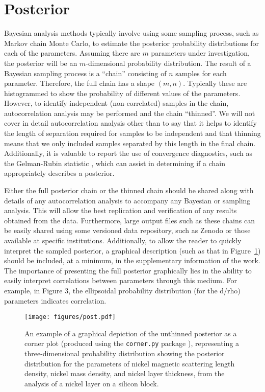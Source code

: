 \documentclass[reprint,superscriptaddress,aps,amsmath,linenumbers]{revtex4-2}
\begin{document}
\section{Posterior}
\label{sec:posterior}

Bayesian analysis methods typically involve using some sampling process, such as Markov chain Monte Carlo, to estimate the posterior probability distributions for each of the parameters. 
Assuming there are $m$ parameters under investigation, the posterior will be an $m$-dimensional probability distribution. 
The result of a Bayesian sampling process is a ``chain'' consisting of $n$ samples for each parameter. 
Therefore, the full chain has a shape $(m, n)$. 
Typically these are histogrammed to show the probability of different values of the parameters. 
However, to identify independent (non-correlated) samples in the chain, autocorrelation analysis \cite{sokal_monte_1997} may be performed and the chain ``thinned''. 
We will not cover in detail autocorrelation analysis other than to say that it helps to identify the length of separation required for samples to be independent and that thinning means that we only included samples separated by this length in the final chain.
Additionally, it is valuable to report the use of convergence diagnostics, such as the Gelman-Rubin statistic \cite{gelman_inference_1992}, which can assist in determining if a chain appropriately describes a posterior. 

Either the full posterior chain or the thinned chain should be shared along with details of any autocorrelation analysis to accompany any Bayesian or sampling analysis. 
This will allow the best replication and verification of any results obtained from the data. 
Furthermore, large output files such as these chains can be easily shared using some versioned data repository, such as Zenodo \cite{european_zenodo_2013} or those available at specific institutions. 
Additionally, to allow the reader to quickly interpret the sampled posterior, a graphical description (such as that in Figure~\ref{fig:post}) should be included, at a minimum, in the supplementary information of the work. 
The importance of presenting the full posterior graphically lies in the ability to easily interpret correlations between parameters through this medium.
For example, in Figure 3, the ellipsoidal probability distribution (for the d/rho) parameters indicates correlation.
%
\begin{figure}
  \texttt{[image: figures/post.pdf]}
  \caption{
    An example of a graphical depiction of the unthinned posterior as a corner plot (produced using the \texttt{corner.py} package \cite{foremanmackey_corner_2016}), representing a three-dimensional probability distribution showing the posterior distribution for the parameters of nickel magnetic scattering length density, nickel mass density, and nickel layer thickness, from the analysis of a nickel layer on a silicon block.
  }
  \label{fig:post}
\end{figure}
%
\end{document}
